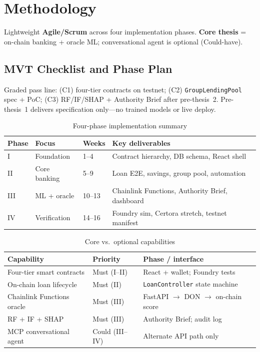 \documentclass[12pt, a4paper]{report}
\newcommand{\tableheadcolor}{\rowcolor{TableHeadBg}}
\begin{document}
\chapter{Methodology}
\label{ch:methodology-compressed}

Lightweight \textbf{Agile/Scrum} across four implementation phases. \textbf{Core thesis} = on-chain banking + oracle ML; conversational agent is optional (Could-have).

\section{MVT Checklist and Phase Plan}
\label{sec:mvt-checklist}

Graded pass line: (C1) four-tier contracts on testnet; (C2) \texttt{GroupLendingPool} spec + PoC; (C3) RF/IF/SHAP + Authority Brief after pre-thesis~2. Pre-thesis~1 delivers specification only---no trained models or live deploy.

\begin{table}[H]
\centering
\caption[Four-phase implementation summary]{Four-phase implementation summary}
\label{tab:phase-summary}
\begin{tabular}{p{1.4cm}p{3.8cm}p{1.6cm}p{6.5cm}}
\toprule
\tableheadcolor
\textbf{Phase} & \textbf{Focus} & \textbf{Weeks} & \textbf{Key deliverables} \\
\midrule
I & Foundation & 1--4 & Contract hierarchy, DB schema, React shell \\
II & Core banking & 5--9 & Loan E2E, savings, group pool, automation \\
III & ML + oracle & 10--13 & Chainlink Functions, Authority Brief, dashboard \\
IV & Verification & 14--16 & Foundry sim, Certora stretch, testnet manifest \\
\bottomrule
\end{tabular}
\end{table}

\begin{table}[H]
\centering
\caption[Core vs.\ optional capabilities]{Core vs.\ optional capabilities}
\label{tab:capability-priority}
\begin{tabular}{p{3.2cm}p{2.2cm}p{7.8cm}}
\toprule
\tableheadcolor
\textbf{Capability} & \textbf{Priority} & \textbf{Phase / interface} \\
\midrule
Four-tier smart contracts & Must (I--II) & React + wallet; Foundry tests \\
On-chain loan lifecycle & Must (II) & \texttt{LoanController} state machine \\
Chainlink Functions oracle & Must (III) & FastAPI $\to$ DON $\to$ on-chain score \\
RF + IF + SHAP & Must (III) & Authority Brief; audit log \\
MCP conversational agent & Could (III--IV) & Alternate API path only \\
\bottomrule
\end{tabular}
\end{table}
\end{document}
